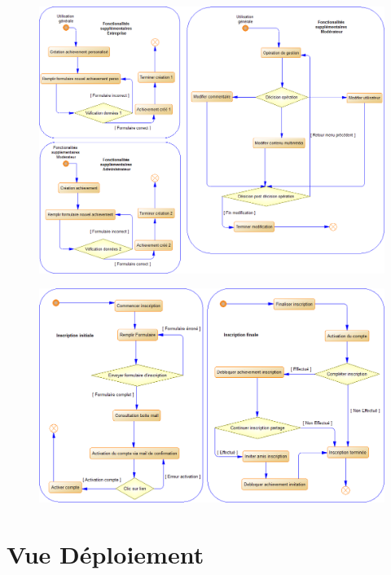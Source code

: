 \documentclass{life-fr}
\begin{document}
\begin{figure}[H]
  \begin{center}
    \includegraphics[width=17cm]{img/processus_principaux_1.png}
  \end{center}
\end{figure}

\vskip 3cm

\begin{figure}[H]
  \begin{center}
    \includegraphics[width=17cm]{img/processus_detailles.png}
  \end{center}
\end{figure}


\chapter{Vue Déploiement}
\end{document}
